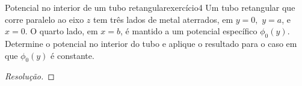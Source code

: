 \begin{exercício}{Potencial no interior de um tubo retangular}{exercício4}
    Um tubo retangular que corre paralelo ao eixo \(z\) tem três lados de metal aterrados, em \(y=0,\) \(y = a\), e \(x= 0.\) O quarto lado, em \(x = b\), é mantido a um potencial específico \(\phi_0(y)\). Determine o potencial no interior do tubo e aplique o resultado para o caso em que \(\phi_0(y)\) é constante.
\end{exercício}
\begin{proof}[Resolução]

\end{proof}
